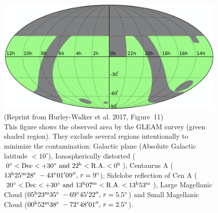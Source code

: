 \begin{figure}[htbp]
	\centering
	\includegraphics[width=.6\linewidth]{Chapter_3/Figures/HurleyWalker_Figure11.png}
    \caption[Reprint from Hurley-Walker et al. 2017 (Figure~11)]{\label{fig:HurleyWalker2017_figure11}
        (Reprint from Hurley-Walker et al. 2017, Figure~11)\\
        This figure shows the observed area by the GLEAM survey (green shaded region).
        They exclude several regions intentionally to minimize the contamination:
        Galactic plane (Absolute Galactic latitude $<10^{\circ}$),
        Ionospherically distorted ($0^{\circ} < \mathrm{Dec} < +30^{\circ}\ \mathrm{and}\ 22^{\mathrm{h}} < \mathrm{R.A.} < 0^{\mathrm{h}}$),
        Centaurus A ($13\msu{h}25\msu{m}28\msu{s}\ -43^{\circ}01'09'',\,r=9^{\circ}$),
        Sidelobe reflection of Cen A ($20^{\circ} < \mr{Dec} < +30^{\circ}\ \mr{and}\ 13\msu{h}07\msu{m} < \mr{R.A.} < 13\msu{h}53\msu{m}$),
        Large Magellanic Cloud ($05\msu{h}23\msu{m}35\msu{s}\ -69^{\circ}45'22'',\,r=5.5^{\circ}$) and Small Magellanic Cloud ($00\msu{h}52\msu{m}38\msu{s}\ -72^{\circ}48'01'',\,r=2.5^{\circ}$).
    }
\end{figure}






%
%
